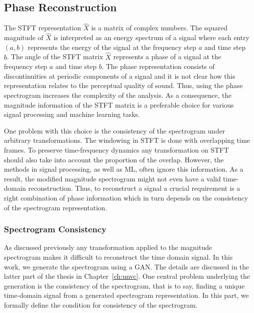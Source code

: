 \subsection{Phase Reconstruction}
\label{subsec:phrecon}
The STFT representation $\hat{X}$ is a matrix of complex numbers. The squared magnitude of $\hat{X}$ is interpreted as an energy spectrum of a signal where each entry $(a,b)$ represents the energy of the signal at the frequency step $a$ and time step $b$. The angle of the STFT matrix $\hat{X}$ represents a phase of a signal at the frequency step $a$ and time step $b$. The phase representation consists of discontinuities at periodic components of a signal and it is not clear how this representation relates to the perceptual quality of sound. Thus, using the phase spectrogram increases the complexity of the analysis. As a consequence, the magnitude information of the STFT matrix is a preferable choice for various signal processing and machine learning tasks.

One problem with this choice is the consistency of the spectrogram under arbitrary transformations. The windowing in STFT is done with overlapping time frames. To preserve time-frequency dynamics any transformation on STFT should also take into account the proportion of the overlap. However, the methods in signal processing, as well as ML, often ignore this information. As a result, the modified magnitude spectrogram might not even have a valid time-domain reconstruction. Thus, to reconstruct a signal a crucial requirement is a right combination of phase information which in turn depends on the consistency of the spectrogram representation.

\subsubsection{Spectrogram Consistency}
\label{subsec:spec_con}
As discussed previously any transformation applied to the magnitude spectrogram makes it difficult to reconstruct the time domain signal. In this work, we generate the spectrogram using a GAN. The details are discussed in the latter part of the thesis in Chapter~\ref{ch:unvc}. One central problem underlying the generation is the consistency of the spectrogram, that is to say, finding a unique time-domain signal from a generated spectrogram representation. In this part, we formally define the condition for consistency of the spectrogram.

